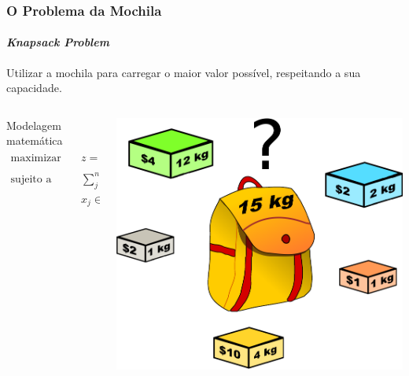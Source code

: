 \documentclass[10pt,fleqn]{beamer}
\begin{document}
\begin{frame}
  \frametitle{O Problema da Mochila} %
  \framesubtitle{\textit{Knapsack Problem}}
  Utilizar a mochila para carregar o maior valor possível, respeitando a sua
  capacidade.
  \begin{columns}[T]
	  \begin{column}{.5\textwidth}
      \begin{block}{Modelagem matemática}
	    { \footnotesize
        \begin{align*}
          \textrm{maximizar} \quad
		  	& z = \sum_{j=1}^n p_j x_j \\
          \textrm{sujeito a} \quad
		  	& \sum_{j=1}^n w_{j}x_j \leq b \\
            & {x_j \in \{0,1\}, \quad j=1,\cdots,n.}
        \end{align*}
		}
      \end{block}
    \end{column}
    \begin{column}{.5\textwidth}
	  \begin{center}
        \includegraphics[scale=0.3]{figs/knapsack}
	  \end{center}
    \end{column}
  \end{columns}
\end{frame}
\end{document}
